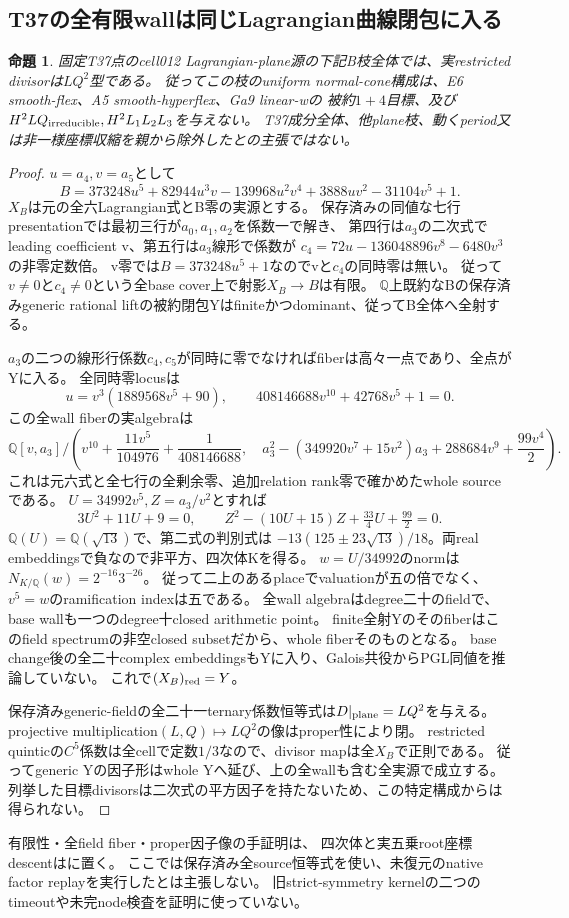\documentclass[a4paper,11pt]{ltjsarticle}
\newtheorem{proposition}{命題}[section]
\theoremstyle{definition}
\begin{document}
\subsection{T37の全有限wallは同じLagrangian曲線閉包に入る}
\begin{proposition}\label{prop:T37-whole-B-plane-closure}
固定T37点のcell012 Lagrangian-plane源の下記B枝全体では、実restricted divisorは$LQ^2$型である。
従ってこの枝のuniform normal-cone構成は、E6 smooth-flex、A5 smooth-hyperflex、Ga9 linear-wの
被約$1+4$目標、及び$H^2LQ_{\rm irreducible},H^2L_1L_2L_3$を与えない。
T37成分全体、他plane枝、動くperiod又は非一様座標収縮を親から除外したとの主張ではない。
\end{proposition}
\begin{proof}
$u=a_4,v=a_5$として
\[
 B=373248u^5+82944u^3v-139968u^2v^4+3888uv^2-31104v^5+1.
\]
$X_B$は元の全六Lagrangian式とB零の実源とする。
保存済みの同値な七行presentationでは最初三行が$a_0,a_1,a_2$を係数一で解き、
第四行は$a_3$の二次式でleading coefficient v、第五行は$a_3$線形で係数が
$c_4=72u-136048896v^8-6480v^3$の非零定数倍。
v零では$B=373248u^5+1$なのでvと$c_4$の同時零は無い。
従って$v\ne0$と$c_4\ne0$という全base cover上で射影$X_B\to B$は有限。
$\mathbb Q$上既約なBの保存済みgeneric rational liftの被約閉包Yはfiniteかつdominant、従ってB全体へ全射する。

$a_3$の二つの線形行係数$c_4,c_5$が同時に零でなければfiberは高々一点であり、全点がYに入る。
全同時零locusは
\[
 u=v^3(1889568v^5+90),\qquad408146688v^{10}+42768v^5+1=0.
\]
この全wall fiberの実algebraは
\[
\mathbb Q[v,a_3]\big/
 \left(v^{10}+\frac{11v^5}{104976}+\frac1{408146688},\quad
 a_3^2-(349920v^7+15v^2)a_3+288684v^9+\frac{99v^4}{2}\right).
\]
これは元六式と全七行の全剰余零、追加relation rank零で確かめたwhole sourceである。
$U=34992v^5,Z=a_3/v^2$とすれば
\[
 3U^2+11U+9=0,\qquad
 Z^2-(10U+15)Z+\tfrac{33}{4}U+\tfrac{99}{2}=0.
\]
$\mathbb Q(U)=\mathbb Q(\sqrt{13})$で、第二式の判別式は
$-13(125\pm23\sqrt{13})/18$。両real embeddingsで負なので非平方、四次体Kを得る。
$w=U/34992$のnormは$N_{K/\mathbb Q}(w)=2^{-16}3^{-26}$。
従って二上のあるplaceでvaluationが五の倍でなく、$v^5=w$のramification indexは五である。
全wall algebraはdegree二十のfieldで、base wallも一つのdegree十closed arithmetic point。
finite全射Yのそのfiberはこのfield spectrumの非空closed subsetだから、whole fiberそのものとなる。
base change後の全二十complex embeddingsもYに入り、Galois共役からPGL同値を推論していない。
これで$(X_B)_{\rm red}=Y$。

保存済みgeneric-fieldの全二十一ternary係数恒等式は$D|_{\rm plane}=LQ^2$を与える。
projective multiplication$(L,Q)\mapsto LQ^2$の像はproper性により閉。
restricted quinticの$C^5$係数は全cellで定数$1/3$なので、divisor mapは全$X_B$で正則である。
従ってgeneric Yの因子形はwhole Yへ延び、上の全wallも含む全実源で成立する。
列挙した目標divisorsは二次式の平方因子を持たないため、この特定構成からは得られない。
\end{proof}
有限性・全field fiber・proper因子像の手証明は、
四次体と実五乗root座標descentはに置く。
ここでは保存済み全source恒等式を使い、未復元のnative factor replayを実行したとは主張しない。
旧strict-symmetry kernelの二つのtimeoutや未完node検査を証明に使っていない。
\end{document}
